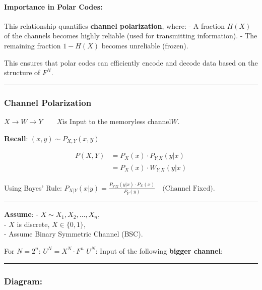 \documentclass[11pt]{article}
\begin{document}
\paragraph{Importance in Polar Codes:}\label{importance-in-polar-codes}

This relationship quantifies \textbf{channel polarization}, where: - A
fraction \(H(X)\) of the channels becomes highly reliable (used for
transmitting information). - The remaining fraction \(1 - H(X)\) becomes
unreliable (frozen).

This ensures that polar codes can efficiently encode and decode data
based on the structure of \(F^N\).

    \begin{center}\rule{0.5\linewidth}{0.5pt}\end{center}

\subsubsection{Channel Polarization}\label{channel-polarization}

\(X \to \boxed{ W } \to Y\)\(\qquad X\)is Input to the memoryless
channel\(W\).

\textbf{Recall}: \((x, y) \sim P_{X,Y}(x, y)\)

\[
\begin{align}
P(X, Y) &= P_X(x) \cdot P_{Y|X}(y|x) \\
        &= P_X(x) \cdot W_{Y|X}(y|x)
\end{align}
\]

Using Bayes' Rule:
\(P_{X|Y}(x|y) = \frac{P_{Y|X}(y|x) \cdot P_X(x)}{P_Y(y)} \quad \text{(Channel Fixed)}.\)

\begin{center}\rule{0.5\linewidth}{0.5pt}\end{center}

\textbf{Assume}: - \(X \sim X_1, X_2, \dots, X_n\),\\
- \(X\) is discrete, \(X \in \{0, 1\}\),\\
- Assume Binary Symmetric Channel (BSC).

For \(N = 2^n\): \(U^N = X^N \cdot F^n\) \(U^N\): Input of the following
\textbf{bigger channel}:

\begin{center}\rule{0.5\linewidth}{0.5pt}\end{center}

\subsubsection{Diagram:}\label{diagram}
\end{document}

